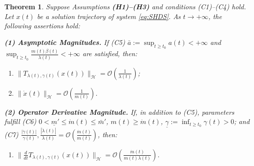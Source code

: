 \documentclass[10pt,a4paper]{amsart}
\newtheorem{theorem}{Theorem}
\begin{document}
\begin{theorem}
\label{thm:pointwise_magnitudes_layered}
Suppose Assumptions {\bf (H1)--(H3)} and conditions {\rm (C1)--(C4)} hold. Let $x(t)$ be a solution trajectory of system \eqref{eq:SHDS}. As $t \to +\infty$, the following assertions hold:

\smallskip
\noindent \textbf{(1) Asymptotic Magnitudes.} If {\rm (C5)} $\bar{a} := \sup_{t \ge t_0} a(t) < +\infty$ and $\sup_{t \geq t_0} \frac{m(t) \beta(t)}{\lambda(t)} < +\infty$ are satisfied, then:
\begin{enumerate}[label=(\roman*), nosep]
    \item $\|T_{\lambda(t), \gamma(t)}(x(t))\|_{\mathcal{H}} = \mathcal{O}( \frac{1}{\lambda(t)})$;
    \item $\|\dot{x}(t)\|_{\mathcal{H}} = \mathcal{O}( \frac{1}{m(t)} )$.
\end{enumerate}

\smallskip
\noindent \textbf{(2) Operator Derivative Magnitude.} If, in addition to {\rm (C5)}, parameters fulfill {\rm (C6)} $0<\underline{m}' \leq \dot{m}(t) \leq \bar{m}'$, $m(t) \geq \dot{m}(t)$, $\underline{\gamma} := \inf_{t \geq t_0} \gamma(t) > 0$; and {\rm (C7)} $\frac{|\dot{\gamma}(t)|}{\gamma(t)}, \frac{|\dot{\lambda}(t)|}{\lambda(t)} = \mathcal{O}( \frac{\dot{m}(t)}{m(t)} )$, then:
\begin{enumerate}[label=(\roman*), resume, nosep]
    \item $\| \frac{d}{dt} T_{\lambda(t), \gamma(t)}(x(t)) \|_{\mathcal{H}} = \mathcal{O}\left( \frac{\dot{m}(t)}{m(t) \lambda(t)} \right)$.
\end{enumerate}


\end{theorem}
\end{document}
